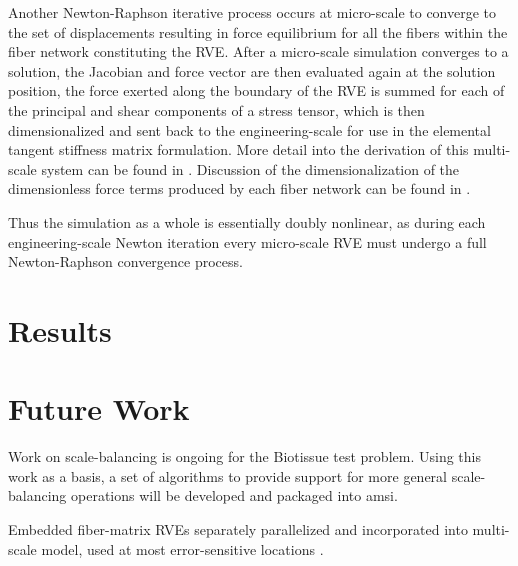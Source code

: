 \documentclass[11pt]{siamltex1213}
\begin{document}
Another Newton-Raphson iterative process occurs at micro-scale to converge to the set of displacements resulting in force equilibrium for all the fibers within the fiber network constituting the RVE. After a micro-scale simulation converges to a solution, the Jacobian and force vector are then evaluated again at the solution position, the force exerted along the boundary of the RVE is summed for each of the principal and shear components of a stress tensor, which is then dimensionalized and sent back to the engineering-scale for use in the elemental tangent stiffness matrix formulation. More detail into the derivation of this multi-scale system can be found in \cite{stylianopoulos2008thesis} \cite{agoram2001coupled} \cite{stylianopoulos2007multiscale} . Discussion of the dimensionalization of the dimensionless force terms produced by each fiber network can be found in \cite{stylianopoulos2007volume} \cite{chandran2007deterministic}.


Thus the simulation as a whole is essentially doubly nonlinear, as during each engineering-scale Newton iteration every micro-scale RVE must undergo a full Newton-Raphson convergence process. 
\section{Results}\label{results}

\section{Future Work}\label{future_work}

Work on scale-balancing is ongoing for the Biotissue test problem. Using this work as a basis, a set of algorithms to provide support for more general scale-balancing operations will be developed and packaged into amsi.

Embedded fiber-matrix RVEs separately parallelized and incorporated into multi-scale model, used at most error-sensitive locations \cite{lake2012mechanics} \cite{zhang2013cross} \cite{zhang2013coupled}.


\end{document}
